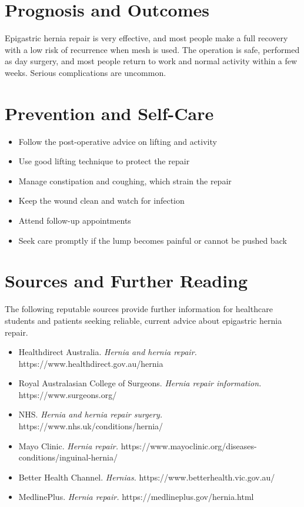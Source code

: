\section*{Prognosis and Outcomes}
Epigastric hernia repair is very effective, and most people make a full recovery with a low risk of recurrence when mesh is used. The operation is safe, performed as day surgery, and most people return to work and normal activity within a few weeks. Serious complications are uncommon.

\section*{Prevention and Self-Care}
\begin{itemize}
    \item Follow the post-operative advice on lifting and activity
    \item Use good lifting technique to protect the repair
    \item Manage constipation and coughing, which strain the repair
    \item Keep the wound clean and watch for infection
    \item Attend follow-up appointments
    \item Seek care promptly if the lump becomes painful or cannot be pushed back
\end{itemize}

\section*{Sources and Further Reading}
The following reputable sources provide further information for healthcare students and patients seeking reliable, current advice about epigastric hernia repair.
\begin{itemize}
    \item Healthdirect Australia. \textit{Hernia and hernia repair.} https://www.healthdirect.gov.au/hernia
    \item Royal Australasian College of Surgeons. \textit{Hernia repair information.} https://www.surgeons.org/
    \item NHS. \textit{Hernia and hernia repair surgery.} https://www.nhs.uk/conditions/hernia/
    \item Mayo Clinic. \textit{Hernia repair.} https://www.mayoclinic.org/diseases-conditions/inguinal-hernia/
    \item Better Health Channel. \textit{Hernias.} https://www.betterhealth.vic.gov.au/
    \item MedlinePlus. \textit{Hernia repair.} https://medlineplus.gov/hernia.html
\end{itemize}
